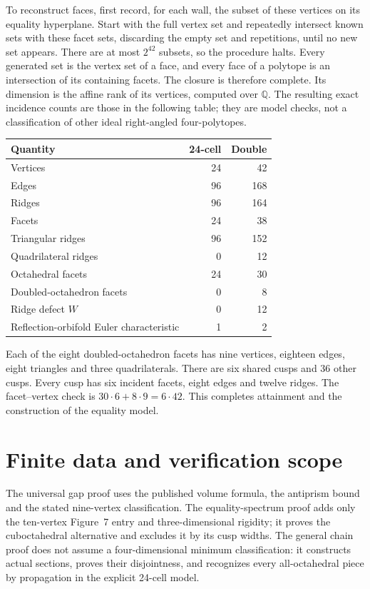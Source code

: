 \documentclass[11pt]{article}
\theoremstyle{remark}
\begin{document}
To reconstruct faces, first record, for each wall, the subset of these
vertices on its equality hyperplane. Start with the full vertex set
and repeatedly intersect known sets with these facet sets, discarding
the empty set and repetitions, until no new set appears. There are
at most $2^{42}$ subsets, so the procedure halts. Every generated set
is the vertex set of a face, and every face of a polytope is an
intersection of its containing facets. The closure is therefore
complete. Its dimension is the affine rank of its vertices, computed
over $\mathbb Q$. The resulting exact incidence counts are those
in the following table; they are model checks, not a classification
of other ideal right-angled four-polytopes.
\begin{center}
\begin{tabular}{lrr}
\toprule Quantity&24-cell&Double\\\midrule
Vertices&24&42\\ Edges&96&168\\ Ridges&96&164\\ Facets&24&38\\
Triangular ridges&96&152\\ Quadrilateral ridges&0&12\\
Octahedral facets&24&30\\ Doubled-octahedron facets&0&8\\
Ridge defect $W$&0&12\\ Reflection-orbifold Euler characteristic&1&2\\
\bottomrule
\end{tabular}
\end{center}
Each of the eight doubled-octahedron facets has nine vertices, eighteen
edges, eight triangles and three quadrilaterals. There are six shared
cusps and 36 other cusps. Every cusp has six incident facets, eight
edges and twelve ridges. The facet--vertex check is
$30\cdot6+8\cdot9=6\cdot42$. This completes attainment and
the construction of the equality model.

\appendix
\section{Finite data and verification scope}
The universal gap proof uses the published volume formula, the
antiprism bound and the stated nine-vertex classification. The
equality-spectrum proof adds only the ten-vertex Figure~7 entry and
three-dimensional rigidity; it proves the cuboctahedral alternative
and excludes it by its cusp widths. The general chain proof does
not assume a four-dimensional minimum classification: it constructs
actual sections, proves their disjointness, and recognizes every
all-octahedral piece by propagation in the explicit 24-cell model.
\end{document}
